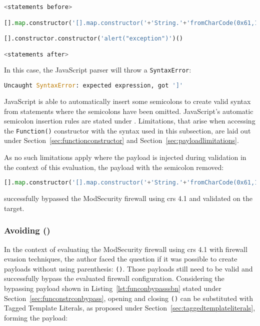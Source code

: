 \begin{lstlisting}[style=basicStyle, language=Python]
<statements before>

[].map.constructor('[].map.constructor('+'String.'+'fromCharCode(0x61,108,0x65,114,116,0x28,96,120,115,115,0x60,0x29)'+')();')()

[].constructor.constructor('alert("exception")')()

<statements after>
\end{lstlisting}

In this case, the JavaScript parser will throw a \verb|SyntaxError|:

\begin{lstlisting}[style=basicStyle, language=Python]
Uncaught SyntaxError: expected expression, got ']'
\end{lstlisting}

JavaScript is able to automatically insert some semicolons to create valid syntax from statements where the semicolons have been omitted. JavaScript's automatic semicolon insertion rules are stated under \cite{js/autosemi}. Limitations, that arise when accessing the \verb|Function()| constructor with the syntax used in this subsection, are laid out under Section~\ref{sec:functionconstructor} and Section~\ref{sec:payloadlimitations}.

As no such limitations apply where the payload is injected during validation in the context of this evaluation, the payload with the semicolon removed:

\begin{lstlisting}[style=basicStyle, language=Python, caption=fromCharCode() bypass]
[].map.constructor('[].map.constructor('+'String.'+'fromCharCode(0x61,108,0x65,114,116,0x28,96,120,115,115,0x60,0x29)'+')();')();
\end{lstlisting}

successfully bypassed the ModSecurity firewall using \acrshort{crs} 4.1 and validated on the target.


\subsubsection{Avoiding ()}
\label{sec:avoidingbypassA}
In the context of evaluating the ModSecurity firewall using \acrshort{crs} 4.1 with firewall evasion techniques, the author faced the question if it was possible to create payloads without using parenthesis: \verb|()|. Those payloads still need to be valid and successfully bypass the evaluated firewall configuration.
Considering the bypassing payload shown in Listing~\ref{lst:funconbypasssbn} stated under Section~\ref{sec:funconstrconbypass}, opening and closing \verb|()| can be substituted with Tagged Template Literals, as proposed under Section~\ref{sec:taggedtemplateliterals}, forming the payload:


